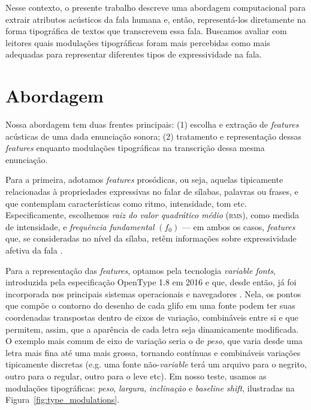 \documentclass[11pt]{article}
\begin{document}
  Nesse contexto, o presente trabalho descreve uma abordagem computacional para extrair atributos acústicos da fala humana e, então, representá-los diretamente na forma tipográfica de textos que transcrevem essa fala. Buscamos avaliar com leitores quais modulações tipográficas foram mais percebidas como mais adequadas para representar diferentes tipos de expressividade na fala.

  \section{Abordagem}
  \label{sec:abordagem}
  
  Nossa abordagem tem duas frentes principais: (1) escolha e extração de {\itshape features} acústicas de uma dada enunciação sonora; (2) tratamento e representação dessas {\itshape features} enquanto modulações tipográficas na transcrição dessa mesma enunciação.
  
  Para a primeira, adotamos {\itshape features} prosódicas, ou seja, aquelas tipicamente relacionadas à propriedades expressivas no falar de sílabas, palavras ou frases, e que contemplam características como ritmo, intensidade, tom etc. Especificamente, escolhemos {\itshape raiz do valor quadrático médio} \textsc{(rms)}, como medida de intensidade, e {\itshape frequência fundamental} $(f_0)$ --- em ambos os casos, {\itshape features} que, se consideradas no nível da sílaba, retêm informações sobre expressividade afetiva da fala \cite{rao2010characterization}.
  
  Para a representação das {\itshape features}, optamos pela tecnologia {\itshape variable fonts}, introduzida pela especificação OpenType 1.8 \cite{varfontssepcs} em 2016 e que, desde então, já foi incorporada nos principais sistemas operacionais e navegadores \cite{varfontossupport}. Nela, os pontos que compõe o contorno do desenho de cada glifo em uma fonte podem ter suas coordenadas transpostas dentro de eixos de variação, combináveis entre si e que permitem, assim, que a aparência de cada letra seja dinamicamente modificada. O exemplo mais comum de eixo de variação seria o de {\itshape peso}, que varia desde uma letra mais fina até uma mais grossa, tornando contínuas e combináveis variações tipicamente discretas (e.g. uma fonte não-{\itshape variable} terá um arquivo para o negrito, outro para o regular, outro para o leve etc). Em nosso teste, usamos as modulações tipográficas: {\itshape peso}, {\itshape largura}, {\itshape inclinação} e {\itshape baseline shift}, ilustradas na Figura~\ref{fig:type_modulations}.
  
\end{document}
